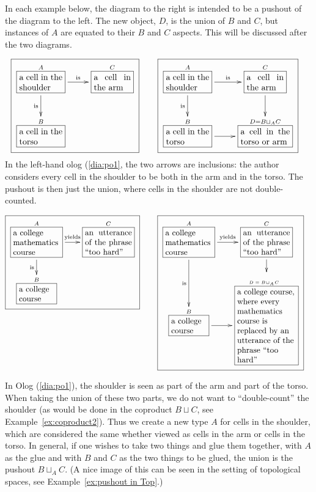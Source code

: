 \documentclass[CT4S-EN-RU]{subfiles}
\begin{document}
\begin{exampleENG}[Pushout]\label{ex:pushout}
In each example below, the diagram to the right is intended to be a pushout of the diagram to the left.  The new object, $D$, is the union of $B$ and $C$, but instances of $A$ are equated to their $B$ and $C$ aspects.  This will be discussed after the two diagrams.

\begin{align}
\label{dia:po1}\fbox{\xymatrixnocompile{\obox{A}{.7in}{a cell in the shoulder}\LA{r}{is}\LAL{d}{is}&\obox{C}{.6in}{a cell in the arm}\\\obox{B}{.7in}{a cell in the torso}}}\hsp&\fbox{\xymatrix{\obox{A}{.7in}{a cell in the shoulder}\LA{r}{is}\LAL{d}{is}&\obox{C}{.6in}{a cell in the arm}\LA{d}{}\\\obox{B}{.7in}{a cell in the torso}\LA{r}{}&\obox{D=B\sqcup_AC}{.8in}{a cell in the torso or arm}}}
\end{align}
In the left-hand olog (\ref{dia:po1}, the two arrows are inclusions: the author considers every cell in the shoulder to be both in the arm and in the torso. The pushout is then just the union, where cells in the shoulder are not double-counted.

\begin{align}\label{dia:po2}\fbox{\xymatrixnocompile@=18pt{\obox{A}{.8in}{\rr a college mathematics course}\LA{r}{yields}\LAL{d}{is}&\obox{C}{.8in}{an utterance of the phrase “too hard”}\\\obox{B}{.6in}{\rr a college course}}}\hsp&\fbox{\xymatrixnocompile@=18pt{\obox{A}{.8in}{\rr a college mathematics course}\LA{r}{yields}\LAL{d}{is}&\obox{C}{.8in}{an utterance of the phrase “too hard”}\LA{d}{}\\\obox{B}{.6in}{\rr a college course}\LA{r}{}&\obox{\parbox{.6in}{\vspace{.1in}\tiny$D=B\!\sqcup_A\!C$}}{1in}{\rr a college course, where every mathematics course is replaced by an utterance of the phrase “too hard”}}}
\end{align}

In Olog (\ref{dia:po1}), the shoulder is seen as part of the arm and part of the torso.  When taking the union of these two parts, we do not want to “double-count” the shoulder (as would be done in the coproduct $B\sqcup C$, see Example~\ref{ex:coproduct2}).  Thus we create a new type $A$ for cells in the shoulder, which are considered the same whether viewed as cells in the arm or cells in the torso.  In general, if one wishes to take two things and glue them together, with $A$ as the glue and with $B$ and $C$ as the two things to be glued, the union is the pushout $B\sqcup_AC$. (A nice image of this can be seen in the setting of topological spaces, see Example~\ref{ex:pushout in Top}.)


\end{exampleENG}
\end{document}
